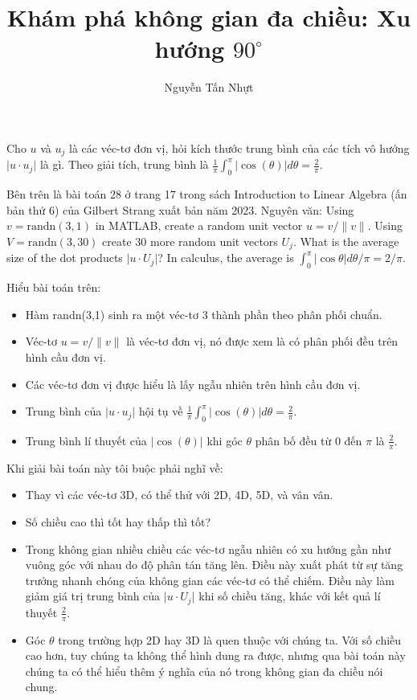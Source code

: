 \documentclass[12pt]{article} %
\title{Khám phá không gian đa chiều: Xu hướng $90^\circ$}
\author{Nguyễn Tấn Nhựt}
\date{}
\begin{document}
\maketitle
Cho $u$ và $u_j$ là các véc-tơ đơn vị, hỏi kích thước trung bình của các tích vô hướng $\lvert u\cdot u_j\rvert$ là gì. Theo giải tích, trung bình là $\frac{1}{\pi}\int_0^\pi\lvert\cos(\theta)\rvert d\theta=\frac{2}{\pi}$.

Bên trên là bài toán 28 ở trang 17 trong sách Introduction to Linear Algebra (ấn bản thứ 6) của Gilbert Strang xuất bản năm 2023. Nguyên văn: Using $v=\mathrm{randn(3,1)}$ in MATLAB, create a random unit vector $u=v/\lVert v\rVert$. Using $V=\mathrm{randn(3,30)}$ create 30 more random unit vectors $U_j$. What is the average size of the dot products $\lvert u\cdot U_j\rvert$? In calculus, the average is $\int_0^\pi\lvert\cos\theta\rvert d\theta/\pi=2/\pi$.

Hiểu bài toán trên:
\begin{itemize}
    \item Hàm randn(3,1) sinh ra một véc-tơ 3 thành phần theo phân phối chuẩn.
    \item Véc-tơ $u=v/\lVert v\rVert$ là véc-tơ đơn vị, nó được xem là có phân phối đều trên hình cầu đơn vị.
    \item Các véc-tơ đơn vị được hiểu là lấy ngẫu nhiên trên hình cầu đơn vị.
    \item Trung bình của $\lvert u\cdot u_j\rvert$ hội tụ về $\frac{1}{\pi}\int_0^\pi\lvert\cos(\theta)\rvert d\theta=\frac{2}{\pi}$.
    \item Trung bình lí thuyết của $\lvert\cos(\theta)\rvert$ khi góc $\theta$ phân bố đều từ $0$ đến $\pi$ là $\frac{2}{\pi}$. 
\end{itemize}
Khi giải bài toán này tôi buộc phải nghĩ về:
\begin{itemize}
    \item Thay vì các véc-tơ 3D, có thể thử với 2D, 4D, 5D, và vân vân.
    \item Số chiều cao thì tốt hay thấp thì tốt?
    \item Trong không gian nhiều chiều các véc-tơ ngẫu nhiên có xu hướng gần như vuông góc với nhau do độ phân tán tăng lên. Điều này xuất phát từ sự tăng trưởng nhanh chóng của không gian các véc-tơ có thể chiếm. Điều này làm giảm giá trị trung bình của $\lvert u\cdot U_j\rvert$ khi số chiều tăng, khác với kết quả lí thuyết $\frac{2}{\pi}$.
    \item Góc $\theta$ trong trường hợp 2D hay 3D là quen thuộc với chúng ta. Với số chiều cao hơn, tuy chúng ta không thể hình dung ra được, nhưng qua bài toán này chúng ta có thể hiểu thêm ý nghĩa của nó trong không gian đa chiều nói chung.
\end{itemize}
\end{document}
